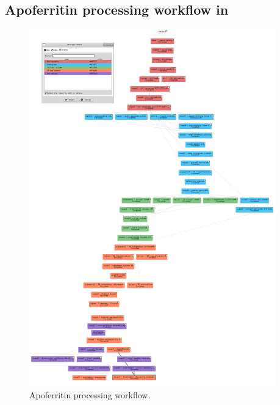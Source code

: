 \subsection*{Apoferritin processing workflow in \scipion}
\begin{figure}[H]
  \centering
  \captionsetup{width=.8\linewidth} 
  \includegraphics[width=0.95\textwidth]
  {images/workflow1.pdf}
  \caption{Apoferritin processing workflow.}
  \label{fig:workflow_pdf}
  \end{figure}






